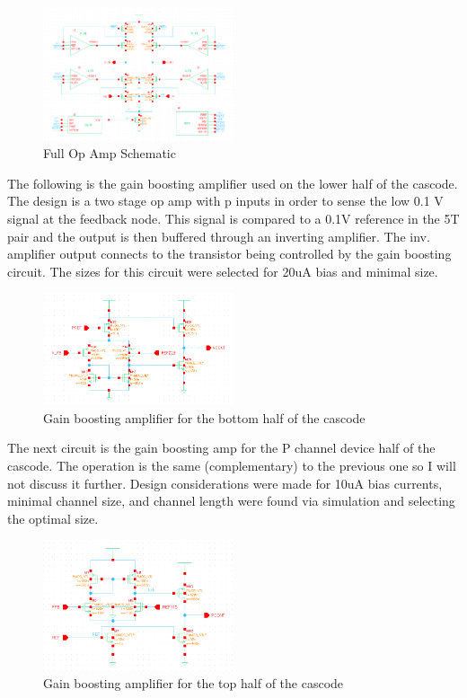 \documentclass[conference]{IEEEtran}
\begin{document}
\FloatBarrier
\begin{figure}[htb]
\centering
\includegraphics[width=0.5\textwidth]{hierchial_op.png}
\caption{Full Op Amp Schematic}
\label{folded}
\end{figure}
\FloatBarrier

The following is the gain boosting amplifier used on the lower half of the cascode. The design is a two stage op amp with p inputs in order to sense the low 0.1 V signal at the feedback node. This signal is compared to a 0.1V reference in the 5T pair and the output is then buffered through an inverting amplifier. The inv. amplifier output connects to the transistor being controlled by the gain boosting circuit. The sizes for this circuit were selected for 20uA bias and minimal size.
\FloatBarrier
\begin{figure}[htb]
\centering
\includegraphics[width=0.5\textwidth]{nfb.png}
\caption{Gain boosting amplifier for the bottom half of the cascode}
\label{folded}
\end{figure}
\FloatBarrier
The next circuit is the gain boosting amp for the P channel device half of the cascode. The operation is the same (complementary) to the previous one so I will not discuss it further. Design considerations were made for 10uA bias currents, minimal channel size, and channel length were found via simulation and selecting the optimal size.

\FloatBarrier
\begin{figure}[htb]
\centering
\includegraphics[width=0.5\textwidth]{pfb.png}
\caption{Gain boosting amplifier for the top half of the cascode}
\label{folded}
\end{figure}
\FloatBarrier
\end{document}
